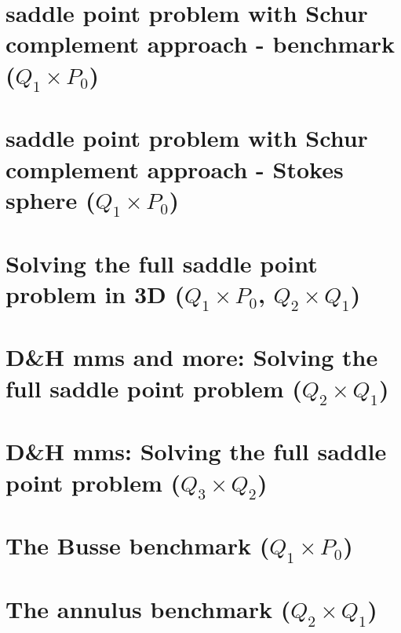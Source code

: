 \documentclass[a4paper,11pt]{report}
\begin{document}
\chapter{saddle point problem with Schur complement approach - benchmark ($Q_1\times P_0$)\label{f15}} %

\chapter{saddle point problem with Schur complement approach - Stokes sphere ($Q_1\times P_0$) \label{f16}} %

\chapter{Solving the full saddle point problem in 3D ($Q_1\times P_0$, $Q_2\times Q_1$)\label{f17}} %

\chapter{D\&H mms and more: Solving the full saddle point problem ($Q_2\times Q_1$) \label{f18}} %

\chapter{D\&H mms: Solving the full saddle point problem ($Q_3\times Q_2$)  \label{f19}} %

\chapter{The Busse benchmark ($Q_1\times P_0$) \label{f20}} %

\chapter{The annulus benchmark ($Q_2\times Q_1$) \label{f21}} %
\end{document}
